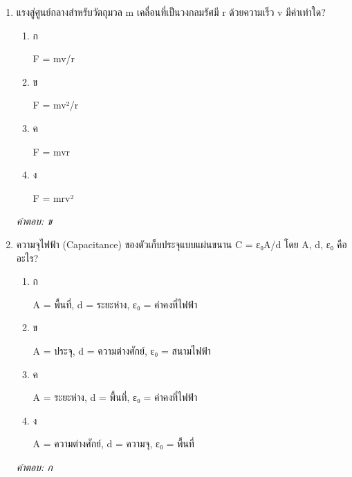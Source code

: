 \documentclass[12pt]{article}
\begin{document}
\begin{enumerate}[label=\arabic*., itemsep=0.5\baselineskip, topsep=0.5\baselineskip, leftmargin=*]
\item แรงสู่ศูนย์กลางสำหรับวัตถุมวล m เคลื่อนที่เป็นวงกลมรัศมี r ด้วยความเร็ว v มีค่าเท่าใด?
\begin{enumerate}[label=\alph*)., itemsep=0.3\baselineskip, topsep=0.3\baselineskip]
\item ก\ 
\begin{minipage}[t]{0.9\linewidth}
\raggedright F = mv/r
\end{minipage}
\item ข\ 
\begin{minipage}[t]{0.9\linewidth}
\raggedright F = mv²/r
\end{minipage}
\item ค\ 
\begin{minipage}[t]{0.9\linewidth}
\raggedright F = mvr
\end{minipage}
\item ง\ 
\begin{minipage}[t]{0.9\linewidth}
\raggedright F = mrv²
\end{minipage}
\end{enumerate}
\vspace{-0.3\baselineskip}
\begin{small}
\textit{คำตอบ: ข}
\end{small}

\item ความจุไฟฟ้า (Capacitance) ของตัวเก็บประจุแบบแผ่นขนาน C = ε₀A/d โดย A, d, ε₀ คืออะไร?
\begin{enumerate}[label=\alph*)., itemsep=0.3\baselineskip, topsep=0.3\baselineskip]
\item ก\ 
\begin{minipage}[t]{0.9\linewidth}
\raggedright A = พื้นที่, d = ระยะห่าง, ε₀ = ค่าคงที่ไฟฟ้า
\end{minipage}
\item ข\ 
\begin{minipage}[t]{0.9\linewidth}
\raggedright A = ประจุ, d = ความต่างศักย์, ε₀ = สนามไฟฟ้า
\end{minipage}
\item ค\ 
\begin{minipage}[t]{0.9\linewidth}
\raggedright A = ระยะห่าง, d = พื้นที่, ε₀ = ค่าคงที่ไฟฟ้า
\end{minipage}
\item ง\ 
\begin{minipage}[t]{0.9\linewidth}
\raggedright A = ความต่างศักย์, d = ความจุ, ε₀ = พื้นที่
\end{minipage}
\end{enumerate}
\vspace{-0.3\baselineskip}
\begin{small}
\textit{คำตอบ: ก}
\end{small}


\end{enumerate}
\end{document}
